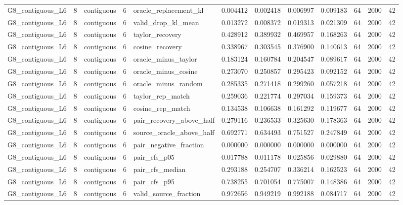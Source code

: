 \begin{tabular}{lrlrlrrrrrrr}
G8_contiguous_L6 & 8 & contiguous & 6 & oracle_replacement_kl & 0.004412 & 0.002418 & 0.006997 & 0.009183 & 64 & 2000 & 42 \\
G8_contiguous_L6 & 8 & contiguous & 6 & valid_drop_kl_mean & 0.013272 & 0.008372 & 0.019313 & 0.021309 & 64 & 2000 & 42 \\
G8_contiguous_L6 & 8 & contiguous & 6 & taylor_recovery & 0.428912 & 0.389932 & 0.469957 & 0.168263 & 64 & 2000 & 42 \\
G8_contiguous_L6 & 8 & contiguous & 6 & cosine_recovery & 0.338967 & 0.303545 & 0.376900 & 0.140613 & 64 & 2000 & 42 \\
G8_contiguous_L6 & 8 & contiguous & 6 & oracle_minus_taylor & 0.183124 & 0.160784 & 0.204547 & 0.089617 & 64 & 2000 & 42 \\
G8_contiguous_L6 & 8 & contiguous & 6 & oracle_minus_cosine & 0.273070 & 0.250857 & 0.295423 & 0.092152 & 64 & 2000 & 42 \\
G8_contiguous_L6 & 8 & contiguous & 6 & oracle_minus_random & 0.285335 & 0.271418 & 0.299260 & 0.057218 & 64 & 2000 & 42 \\
G8_contiguous_L6 & 8 & contiguous & 6 & taylor_rep_match & 0.259036 & 0.221774 & 0.297034 & 0.159373 & 64 & 2000 & 42 \\
G8_contiguous_L6 & 8 & contiguous & 6 & cosine_rep_match & 0.134538 & 0.106638 & 0.161292 & 0.119677 & 64 & 2000 & 42 \\
G8_contiguous_L6 & 8 & contiguous & 6 & pair_recovery_above_half & 0.279116 & 0.236533 & 0.325630 & 0.178363 & 64 & 2000 & 42 \\
G8_contiguous_L6 & 8 & contiguous & 6 & source_oracle_above_half & 0.692771 & 0.634493 & 0.751527 & 0.247849 & 64 & 2000 & 42 \\
G8_contiguous_L6 & 8 & contiguous & 6 & pair_negative_fraction & 0.000000 & 0.000000 & 0.000000 & 0.000000 & 64 & 2000 & 42 \\
G8_contiguous_L6 & 8 & contiguous & 6 & pair_cfs_p05 & 0.017788 & 0.011178 & 0.025856 & 0.029880 & 64 & 2000 & 42 \\
G8_contiguous_L6 & 8 & contiguous & 6 & pair_cfs_median & 0.293188 & 0.254707 & 0.336214 & 0.162523 & 64 & 2000 & 42 \\
G8_contiguous_L6 & 8 & contiguous & 6 & pair_cfs_p95 & 0.738255 & 0.701054 & 0.775007 & 0.148386 & 64 & 2000 & 42 \\
G8_contiguous_L6 & 8 & contiguous & 6 & valid_source_fraction & 0.972656 & 0.949219 & 0.992188 & 0.084717 & 64 & 2000 & 42 \\

\end{tabular}
